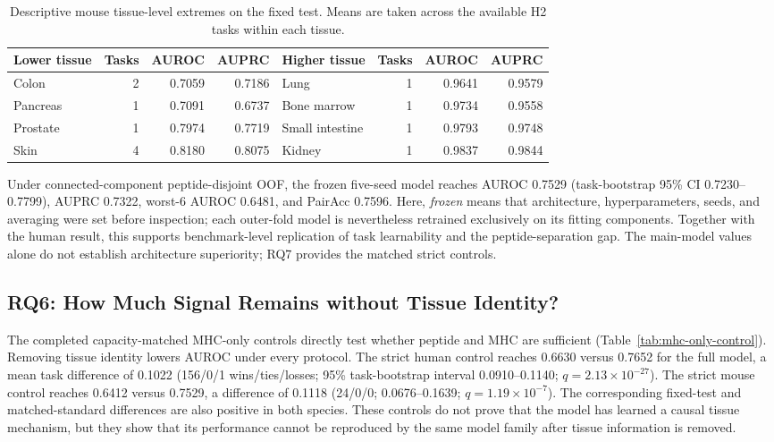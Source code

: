 \begin{table}[tbp]
\centering
\caption{Descriptive mouse tissue-level extremes on the fixed test. Means are taken across the available H2 tasks within each tissue.}
\label{tab:mouse-tissue-extremes}
\footnotesize
\setlength{\tabcolsep}{2pt}
\begin{tabular}{lrrrlrrr}
\toprule
Lower tissue & Tasks & AUROC & AUPRC & Higher tissue & Tasks & AUROC & AUPRC \\ 
\midrule
Colon & 2 & 0.7059 & 0.7186 & Lung & 1 & 0.9641 & 0.9579 \\ 
Pancreas & 1 & 0.7091 & 0.6737 & Bone marrow & 1 & 0.9734 & 0.9558 \\ 
Prostate & 1 & 0.7974 & 0.7719 & Small intestine & 1 & 0.9793 & 0.9748 \\ 
Skin & 4 & 0.8180 & 0.8075 & Kidney & 1 & 0.9837 & 0.9844 \\ 
\bottomrule
\end{tabular}
\end{table}

Under connected-component peptide-disjoint OOF, the frozen five-seed model reaches AUROC 0.7529 (task-bootstrap 95\% CI 0.7230--0.7799), AUPRC 0.7322, worst-6 AUROC 0.6481, and PairAcc 0.7596. Here, \emph{frozen} means that architecture, hyperparameters, seeds, and averaging were set before inspection; each outer-fold model is nevertheless retrained exclusively on its fitting components. Together with the human result, this supports benchmark-level replication of task learnability and the peptide-separation gap. The main-model values alone do not establish architecture superiority; RQ7 provides the matched strict controls.

\FloatBarrier
\subsection{RQ6: How Much Signal Remains without Tissue Identity?}

The completed capacity-matched MHC-only controls directly test whether peptide and MHC are sufficient (Table~\ref{tab:mhc-only-control}). Removing tissue identity lowers AUROC under every protocol. The strict human control reaches 0.6630 versus 0.7652 for the full model, a mean task difference of 0.1022 (156/0/1 wins/ties/losses; 95\% task-bootstrap interval 0.0910--0.1140; \(q=2.13\times10^{-27}\)). The strict mouse control reaches 0.6412 versus 0.7529, a difference of 0.1118 (24/0/0; 0.0676--0.1639; \(q=1.19\times10^{-7}\)). The corresponding fixed-test and matched-standard differences are also positive in both species. These controls do not prove that the model has learned a causal tissue mechanism, but they show that its performance cannot be reproduced by the same model family after tissue information is removed.

